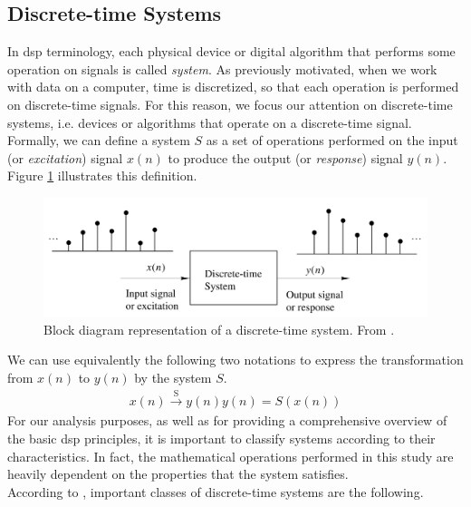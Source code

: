 \subsection{Discrete-time Systems}
In \gls{dsp} terminology, each physical device or digital algorithm that performs some operation on signals is called \textit{system}. As previously motivated, when we work with data on a computer, time is discretized, so that each operation is performed on discrete-time signals. For this reason, we focus our attention on discrete-time systems, i.e. devices or algorithms that operate on a discrete-time signal. \\
Formally, we can define a system $S$ as a set of operations performed on the input (or \textit{excitation}) signal $x(n)$ to produce the output (or \textit{response}) signal $y(n)$. Figure \ref{fig:dtsystem} illustrates this definition. \\
\begin{figure}[]
	\begin{center}
		\includegraphics[scale=0.4]{img/dtsystem.png}
		\captionsetup{margin=2cm}
		\caption{Block diagram representation of a discrete-time system. From \cite{proakis2006dimitris}.} 
		\label{fig:dtsystem}
	\end{center}
\end{figure}
\noindent We can use equivalently the following two notations to express the transformation from $x(n)$ to $y(n)$ by the system $S$.
\begin{align}
	x(n) \xrightarrow{\text{S}} y(n)
	y(n) = S(x(n))
\end{align}
\noindent For our analysis purposes, as well as for providing a comprehensive
overview of the basic \gls{dsp} principles, it is important to classify systems according to their characteristics. In fact, the mathematical operations performed in this study are heavily dependent on the properties that the system satisfies. \\
According to \cite{proakis2006dimitris}, important classes of discrete-time systems are the following.

